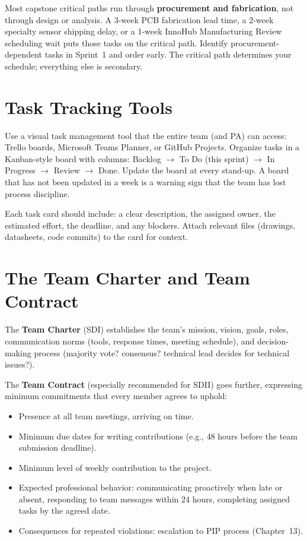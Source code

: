 \begin{tipbox}
Most capstone critical paths run through \textbf{procurement and fabrication}, not through design or analysis. A 3-week PCB fabrication lead time, a 2-week specialty sensor shipping delay, or a 1-week InnoHub Manufacturing Review scheduling wait puts those tasks on the critical path. Identify procurement-dependent tasks in Sprint~1 and order early. The critical path determines your schedule; everything else is secondary.
\end{tipbox}

\section{Task Tracking Tools}
Use a visual task management tool that the entire team (and PA) can access: Trello boards, Microsoft Teams Planner, or GitHub Projects. Organize tasks in a Kanban-style board with columns: Backlog $\to$ To Do (this sprint) $\to$ In Progress $\to$ Review $\to$ Done. Update the board at every stand-up. A board that has not been updated in a week is a warning sign that the team has lost process discipline.

Each task card should include: a clear description, the assigned owner, the estimated effort, the deadline, and any blockers. Attach relevant files (drawings, datasheets, code commits) to the card for context.

\section{The Team Charter and Team Contract}
The \textbf{Team Charter} (SDI) establishes the team's mission, vision, goals, roles, communication norms (tools, response times, meeting schedule), and decision-making process (majority vote? consensus? technical lead decides for technical issues?).

The \textbf{Team Contract} (especially recommended for SDII) goes further, expressing minimum commitments that every member agrees to uphold:
\begin{itemize}[nosep,leftmargin=1.5em]
\item Presence at all team meetings, arriving on time.
\item Minimum due dates for writing contributions (e.g., 48 hours before the team submission deadline).
\item Minimum level of weekly contribution to the project.
\item Expected professional behavior: communicating proactively when late or absent, responding to team messages within 24 hours, completing assigned tasks by the agreed date.
\item Consequences for repeated violations: escalation to PIP process (Chapter~13).
\end{itemize}

